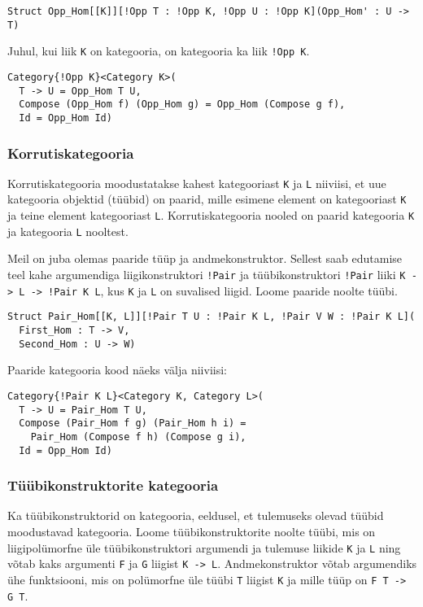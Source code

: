 \documentclass[12pt]{article}
\begin{document}
        \begin{verbatim}Struct Opp_Hom[[K]][!Opp T : !Opp K, !Opp U : !Opp K](Opp_Hom' : U -> T)\end{verbatim}

        Juhul, kui liik \verb!K! on kategooria, on kategooria ka liik \verb"!Opp K".

        \begin{verbatim}Category{!Opp K}<Category K>(
  T -> U = Opp_Hom T U,
  Compose (Opp_Hom f) (Opp_Hom g) = Opp_Hom (Compose g f),
  Id = Opp_Hom Id)\end{verbatim}
      \subsubsection{Korrutiskategooria}
        Korrutiskategooria moodustatakse kahest kategooriast \verb!K! ja \verb!L! niiviisi, et uue kategooria objektid (tüübid) on paarid, mille esimene element on kategooriast \verb!K! ja teine element kategooriast \verb!L!. Korrutiskategooria nooled on paarid kategooria \verb!K! ja kategooria \verb!L! nooltest.

        Meil on juba olemas paaride tüüp ja andmekonstruktor. Sellest saab edutamise teel kahe argumendiga liigikonstruktori \verb"!Pair" ja tüübikonstruktori \verb"!Pair" liiki \verb"K -> L -> !Pair K L", kus \verb!K! ja \verb!L! on suvalised liigid. Loome paaride noolte tüübi.

        \begin{verbatim}Struct Pair_Hom[[K, L]][!Pair T U : !Pair K L, !Pair V W : !Pair K L](
  First_Hom : T -> V,
  Second_Hom : U -> W)\end{verbatim}

        Paaride kategooria kood näeks välja niiviisi:

        \begin{verbatim}Category{!Pair K L}<Category K, Category L>(
  T -> U = Pair_Hom T U,
  Compose (Pair_Hom f g) (Pair_Hom h i) =
    Pair_Hom (Compose f h) (Compose g i),
  Id = Opp_Hom Id)\end{verbatim}
      \subsubsection{Tüübikonstruktorite kategooria}
        Ka tüübikonstruktorid on kategooria, eeldusel, et tulemuseks olevad tüübid moodustavad kategooria. Loome tüübikonstruktorite noolte tüübi, mis on liigipolümorfne üle tüübikonstruktori argumendi ja tulemuse liikide \verb!K! ja \verb!L! ning võtab kaks argumenti \verb!F! ja \verb!G! liigist \verb!K -> L!. Andmekonstruktor võtab argumendiks ühe funktsiooni, mis on polümorfne üle tüübi \verb!T! liigist \verb!K! ja mille tüüp on \verb!F T -> G T!.
\end{document}
